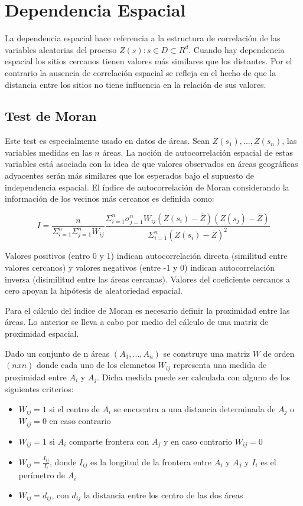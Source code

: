 \section{Dependencia Espacial}

La dependencia espacial hace referencia a la estructura de correlación de las variables aleatorias del proceso
${Z(s) : s \in D \subset R^d }$. Cuando hay dependencia espacial los sitios
cercanos tienen valores más similares que los distantes. Por el contrario la ausencia de correlación espacial se refleja en el hecho de que la distancia entre los sitios no tiene influencia
en la relación de sus valores. \cite{giraldo}

\subsection{Test de Moran}

Este test es especialmente usado en datos de áreas. Sean $Z(s_1 ), ... , Z(s_n)$, las variables medidas en las $n$ áreas. La noción de autocorrelación espacial de estas variables está asociada con la idea de que valores observados en áreas geográficas adyacentes serán más similares que los esperados bajo el supuesto de independencia espacial. El índice de autocorrelación de Moran considerando la información de los vecinos más cercanos es definida
como:

$$ I = \frac{n}{\Sigma_{i=1}^{n} \Sigma_{j=1}^{n} W_{ij}}\frac{\Sigma_{i=1}^{n} \sigma_{j=1}^{n} W_{ij}(Z(s_i) - \overline{Z})(Z(s_j) - \overline{Z}) }{\Sigma_{i=1}^{n}  (Z(s_i) - \overline{Z})^2 }$$

Valores positivos (entro 0 y 1) indican autocorrelación directa (similitud entre valores cercanos) y valores negativos (entre -1 y 0) indican autocorrelación inversa (disimilitud entre las áreas cercanas). Valores del coeficiente cercanos a cero apoyan la hipótesis de aleatoriedad espacial.

Para el cálculo del índice de Moran es necesario definir la proximidad entre las áreas. Lo anterior se lleva a cabo por medio del cálculo de una matriz de proximidad espacial. 

Dado un conjunto de n áreas $(A_1, ..., A_n)$ se construye una matriz $W$ de orden $(n x n)$ donde cada uno de los elemnetos $W_{ij}$ representa una medida de proximidad entre $A_i$ y $A_j$. Dicha medida puede ser calculada con alguno de los siguientes criterios:

\begin{itemize}
    \item $W_{ij} = 1$  si el centro de $A_i$ se encuentra a una distancia determinada de $A_j$ o $W_{ij}=0$ en caso contrario
    \item $W_{ij} = 1$ si $A_i$ comparte frontera con $A_j$ y en caso contrario $W_{ij}=0$ 
    \item $W_{ij} = \frac{I_{ij}}{I_i}$, donde $I_{ij}$ es la longitud de la frontera entre $A_i$ y $A_j$ y $I_i$ es el perímetro de $A_i$ 
    \item $W_{ij} = d_{ij}$, con $d_{ij}$ la distancia entre los centro de las dos áreas
\end{itemize}

